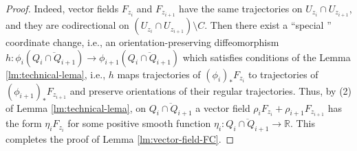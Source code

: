 \documentclass[10pt,a4paper]{amsart}
\newcommand{\bbR}{\mathbb{R}}
\begin{document}
\begin{proof}
{Indeed,  vector fields $F_{z_i}$ and $F_{z_{i+1}}$ have the same trajectories on $U_{z_i}\cap U_{z_{i+1}}$, and they are codirectional on $(U_{z_i}\cap U_{z_{i+1}})\setminus C$. Then there exist a ``special '' coordinate change, i.e., an orientation-preserving diffeomorphism 
$h:\phi_i(\overline{Q_i\cap Q_{i+1}})\to \phi_{i+1}(\overline{Q_i\cap Q_{i+1}})$ which satisfies conditions of the Lemma \ref{lm:technical-lema}, i.e., $h$ maps  trajectories of $(\phi_i)_*F_{z_i}$ to  trajectories of $(\phi_{i+1})_*F_{z_{i+1}}$ and preserve orientations of their regular trajectories. Thus, by (2) of Lemma \ref{lm:technical-lema}, on $\overline{Q_i\cap Q_{i+1}}$ a vector field
$\rho_iF_{z_i}+\rho_{i+1} F_{z_{i+1}}$ has the form $\eta_{i} F_{z_{i}}$ for some positive smooth function $\eta_{i}:\overline{Q_i\cap Q_{i+1}}\to \bbR$. This completes the proof of  Lemma \ref{lm:vector-field-FC}.}
\end{proof}
\end{document}
